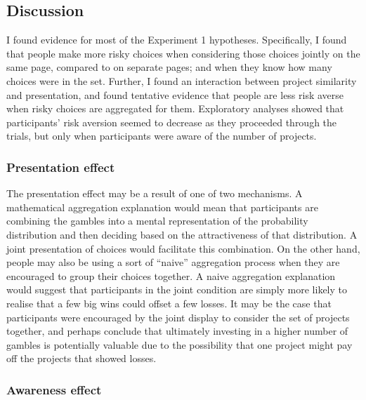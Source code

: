 \documentclass[a4paper, nobind, dvipsnames]{templates/ociamthesis}
\theoremstyle{definition}
\theoremstyle{definition}
\theoremstyle{definition}
\theoremstyle{definition}
\theoremstyle{remark}
\begin{document}
\hypertarget{discussion-aggregation-1}{%
\subsection{Discussion}\label{discussion-aggregation-1}}

I found evidence for most of the Experiment 1 hypotheses. Specifically, I found
that people make more risky choices when considering those choices jointly on
the same page, compared to on separate pages; and when they know how many
choices were in the set. Further, I found an interaction between project
similarity and presentation, and found tentative evidence that people are less
risk averse when risky choices are aggregated for them. Exploratory analyses
showed that participants' risk aversion seemed to decrease as they proceeded
through the trials, but only when participants were aware of the number of
projects.

\subsubsection{Presentation effect}

The presentation effect may be a result of one of two mechanisms. A mathematical
aggregation explanation would mean that participants are combining the gambles
into a mental representation of the probability distribution and then deciding
based on the attractiveness of that distribution. A joint presentation of
choices would facilitate this combination. On the other hand, people may also be
using a sort of ``naive'' aggregation process when they are encouraged to group
their choices together. A naive aggregation explanation would suggest that
participants in the joint condition are simply more likely to realise that a few
big wins could offset a few losses. It may be the case that participants were
encouraged by the joint display to consider the set of projects together, and
perhaps conclude that ultimately investing in a higher number of gambles is
potentially valuable due to the possibility that one project might pay off the
projects that showed losses.

\subsubsection{Awareness effect}
\end{document}
